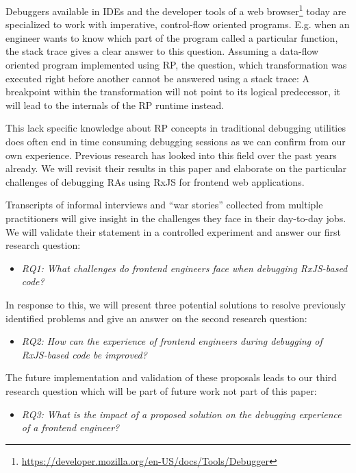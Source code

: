 \documentclass[12pt,a4paper]{article}
\begin{document}
Debuggers available in IDEs and the developer tools of a web browser\footnote{\url{https://developer.mozilla.org/en-US/docs/Tools/Debugger}} today are specialized to work with imperative, control-flow oriented programs. E.g. when an engineer wants to know which part of the program called a particular function, the stack trace gives a clear answer to this question. Assuming a data-flow oriented program implemented using RP, the question, which transformation was executed right before another cannot be answered using a stack trace: A breakpoint within the transformation will not point to its logical predecessor, it will lead to the internals of the RP runtime instead.

This lack specific knowledge about RP concepts in traditional debugging utilities does often end in time consuming debugging sessions as we can confirm from our own experience. Previous research has looked into this field \cite{10.1145/2577080.2577083} \cite{10.1145/2884781.2884815} \cite{10.1145/3180155.3180156} over the past years already. We will revisit their results in this paper and elaborate on the particular challenges of debugging RAs using RxJS for frontend web applications.

Transcripts of informal interviews and ``war stories'' collected from multiple practitioners will give insight in the challenges they face in their day-to-day jobs. We will validate their statement in a controlled experiment and answer our first research question:

\begin{itemize}
	\item \emph{RQ1: What challenges do frontend engineers face when debugging RxJS-based code?}
\end{itemize}

In response to this, we will present three potential solutions to resolve previously identified problems and give an answer on the second research question:

\begin{itemize}
	\item \emph{RQ2: How can the experience of frontend engineers during debugging of RxJS-based code be improved?}
\end{itemize}

The future implementation and validation of these proposals leads to our third research question which will be part of future work not part of this paper:

\begin{itemize}
	\item \emph{RQ3: What is the impact of a proposed solution on the debugging experience of a frontend engineer?}
\end{itemize}
\end{document}
